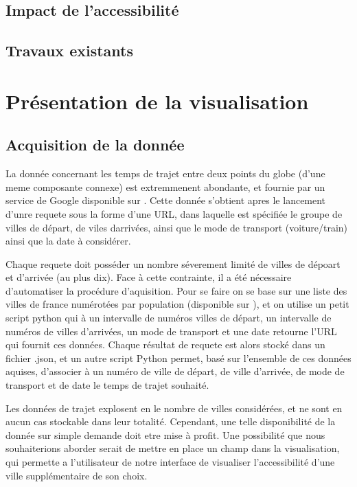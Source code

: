 \documentclass{vgtc}                          %
\begin{document}
\vspace{0.3cm}
\subsection{Impact de l'accessibilité}

\vspace{0.3cm}

\subsection{Travaux existants}


\section{Présentation de la visualisation}

\vspace{0.3cm}

\subsection{Acquisition de la donnée}

\vspace{0.3cm}

La donnée concernant les temps de trajet entre deux points du globe (d'une meme composante connexe) est extremmenent abondante, et fournie par un service de Google disponible sur  . Cette donnée s'obtient apres le lancement d'unre requete sous la forme d'une URL, dans laquelle est spécifiée le groupe de villes de départ, de viles darrivées, ainsi que le mode de transport (voiture/train) ainsi que la date à considérer. 

Chaque requete doit posséder un nombre séverement limité de villes de dépoart et d'arrivée (au plus dix). Face à cette contrainte, il a été nécessaire d'automatiser la procédure d'aquisition. Pour se faire on se base sur une liste des villes de france numérotées par population (disponible sur ), et on utilise un petit script python qui à un intervalle de numéros villes de départ, un intervalle de numéros de villes d'arrivées, un mode de transport et une date retourne l'URL qui fournit ces données. Chaque résultat de requete est alors stocké dans un fichier .json, et un autre script Python permet, basé sur l'ensemble de ces données aquises, d'associer à un numéro de ville de départ, de ville d'arrivée, de mode de transport et de date le temps de trajet souhaité. 

Les données de trajet explosent en le nombre de villes considérées, et ne sont en aucun cas stockable dans leur totalité. Cependant, une telle disponibilité de la donnée sur simple demande doit etre mise à profit. Une possibilité que nous souhaiterions aborder serait de mettre en place un champ dans la visualisation, qui permette a l'utilisateur de notre interface de visualiser l'accessibilité d'une ville supplémentaire de son choix.
\end{document}
